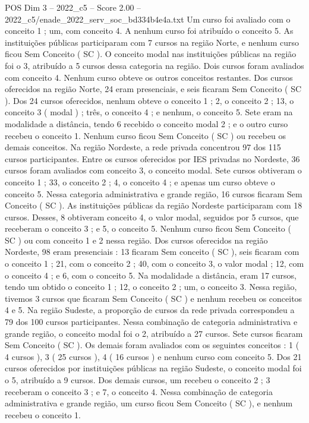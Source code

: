 \begin{textsample}{POS Dim 3 – 2022\_c5 – Score 2.00 – 2022\_c5/enade\_2022\_serv\_soc\_bd334b4e4a.txt}
Um curso foi avaliado com o conceito 1 ; um, com conceito 4.
A nenhum curso foi atribuído o conceito 5.
As instituições públicas participaram com 7 cursos na região Norte, e nenhum curso ficou Sem Conceito ( SC ).
O conceito modal nas instituições públicas na região foi o 3, atribuído a 5 cursos dessa categoria na região.
Dois cursos foram avaliados com conceito 4.
Nenhum curso obteve os outros conceitos restantes.
Dos cursos oferecidos na região Norte, 24 eram presenciais, e seis ficaram Sem Conceito ( SC ).
Dos 24 cursos oferecidos, nenhum obteve o conceito 1 ; 2, o conceito 2 ; 13, o conceito 3 ( modal ) ; três, o conceito 4 ; e nenhum, o conceito 5.
Sete eram na modalidade a distância, tendo 6 recebido o conceito modal 2 ; e o outro curso recebeu o conceito 1.
Nenhum curso ficou Sem Conceito ( SC ) ou recebeu os demais conceitos.
Na região Nordeste, a rede privada concentrou 97 dos 115 cursos participantes.
Entre os cursos oferecidos por IES privadas no Nordeste, 36 cursos foram avaliados com conceito 3, o conceito modal.
Sete cursos obtiveram o conceito 1 ; 33, o conceito 2 ; 4, o conceito 4 ; e apenas um curso obteve o conceito 5.
Nessa categoria administrativa e grande região, 16 cursos ficaram Sem Conceito ( SC ).
As instituições públicas da região Nordeste participaram com 18 cursos.
Desses, 8 obtiveram conceito 4, o valor modal, seguidos por 5 cursos, que receberam o conceito 3 ; e 5, o conceito 5.
Nenhum curso ficou Sem Conceito ( SC ) ou com conceito 1 e 2 nessa região.
Dos cursos oferecidos na região Nordeste, 98 eram presenciais : 13 ficaram Sem conceito ( SC ), seis ficaram com o conceito 1 ; 21, com o conceito 2 ; 40, com o conceito 3, o valor modal ; 12, com o conceito 4 ; e 6, com o conceito 5.
Na modalidade a distância, eram 17 cursos, tendo um obtido o conceito 1 ; 12, o conceito 2 ; um, o conceito 3.
Nessa região, tivemos 3 cursos que ficaram Sem Conceito ( SC ) e nenhum recebeu os conceitos 4 e 5.
Na região Sudeste, a proporção de cursos da rede privada correspondeu a 79 dos 100 cursos participantes.
Nessa combinação de categoria administrativa e grande região, o conceito modal foi o 2, atribuído a 27 cursos.
Sete cursos ficaram Sem Conceito ( SC ).
Os demais foram avaliados com os seguintes conceitos : 1 ( 4 cursos ), 3 ( 25 cursos ), 4 ( 16 cursos ) e nenhum curso com conceito 5.
Dos 21 cursos oferecidos por instituições públicas na região Sudeste, o conceito modal foi o 5, atribuído a 9 cursos.
Dos demais cursos, um recebeu o conceito 2 ; 3 receberam o conceito 3 ; e 7, o conceito 4.
Nessa combinação de categoria administrativa e grande região, um curso ficou Sem Conceito ( SC ), e nenhum recebeu o conceito 1.

\end{textsample}
